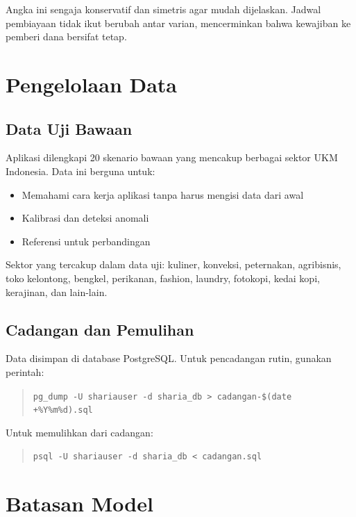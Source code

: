 \documentclass[12pt,a4paper,twoside]{report}
\begin{document}
Angka ini sengaja konservatif dan simetris agar mudah dijelaskan. Jadwal pembiayaan tidak ikut berubah antar varian, mencerminkan bahwa kewajiban ke pemberi dana bersifat tetap.

\chapter{Pengelolaan Data}

\section{Data Uji Bawaan}

Aplikasi dilengkapi 20 skenario bawaan yang mencakup berbagai sektor UKM Indonesia. Data ini berguna untuk:
\begin{itemize}
  \item Memahami cara kerja aplikasi tanpa harus mengisi data dari awal
  \item Kalibrasi dan deteksi anomali
  \item Referensi untuk perbandingan
\end{itemize}

Sektor yang tercakup dalam data uji: kuliner, konveksi, peternakan, agribisnis, toko kelontong, bengkel, perikanan, fashion, laundry, fotokopi, kedai kopi, kerajinan, dan lain-lain.

\section{Cadangan dan Pemulihan}

Data disimpan di database PostgreSQL. Untuk pencadangan rutin, gunakan perintah:

\begin{quote}
\verb|pg_dump -U shariauser -d sharia_db > cadangan-$(date +%Y%m%d).sql|
\end{quote}

Untuk memulihkan dari cadangan:

\begin{quote}
\verb|psql -U shariauser -d sharia_db < cadangan.sql|
\end{quote}

\chapter{Batasan Model}
\label{chap:batasan}
\end{document}
